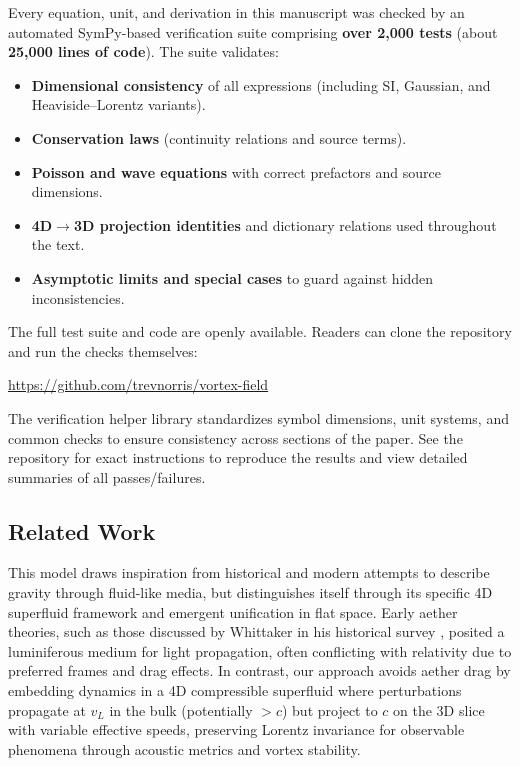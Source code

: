 Every equation, unit, and derivation in this manuscript was checked by an automated SymPy-based verification suite comprising \textbf{over 2{,}000 tests} (about \textbf{25{,}000 lines of code}). The suite validates:
\begin{itemize}
  \item \textbf{Dimensional consistency} of all expressions (including SI, Gaussian, and Heaviside–Lorentz variants).
  \item \textbf{Conservation laws} (continuity relations and source terms).
  \item \textbf{Poisson and wave equations} with correct prefactors and source dimensions.
  \item \textbf{4D$\to$3D projection identities} and dictionary relations used throughout the text.
  \item \textbf{Asymptotic limits and special cases} to guard against hidden inconsistencies.
\end{itemize}

The full test suite and code are openly available. Readers can clone the repository and run the checks themselves:
\begin{center}
\url{https://github.com/trevnorris/vortex-field}
\end{center}

The verification helper library standardizes symbol dimensions, unit systems, and common checks to ensure consistency across sections of the paper. See the repository for exact instructions to reproduce the results and view detailed summaries of all passes/failures.

\subsection{Related Work}

This model draws inspiration from historical and modern attempts to describe gravity through fluid-like media, but distinguishes itself through its specific 4D superfluid framework and emergent unification in flat space. Early aether theories, such as those discussed by Whittaker in his historical survey \cite{whittaker1951history}, posited a luminiferous medium for light propagation, often conflicting with relativity due to preferred frames and drag effects. In contrast, our approach avoids aether drag by embedding dynamics in a 4D compressible superfluid where perturbations propagate at $v_L$ in the bulk (potentially $>c$) but project to $c$ on the 3D slice with variable effective speeds, preserving Lorentz invariance for observable phenomena through acoustic metrics and vortex stability.

